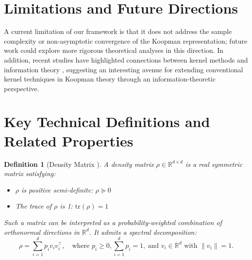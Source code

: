 \documentclass{article} %
\newtheorem{lemma}[theorem]{Lemma}
\newtheorem{definition}[theorem]{Definition}
\begin{document}
\section{Limitations and Future Directions} \label{append:limit_and_future}
A current limitation of our framework is that it does not address the sample complexity or non-asymptotic convergence of the Koopman representation; future work could explore more rigorous theoretical analyses in this direction. In addition, recent studies have highlighted connections between kernel methods \citep{ kostic2022learning, kostic2023sharp, kostic2024consistent} and information theory \citep{bach2022information}, suggesting an interesting avenue for extending conventional kernel techniques in Koopman theory through an information-theoretic perspective.



\clearpage
\section{Key Technical Definitions and Related Properties} \label{append:def_and_prop}

\begin{definition}[Density Matrix \citep{bach2022information}]
A \emph{density matrix} \( \rho \in \mathbb{R}^{d \times d} \) is a real symmetric matrix satisfying:
\begin{itemize}
    \item \( \rho \) is positive semi-definite: \( \rho \succeq 0 \)
    \item The trace of \( \rho \) is 1: \( \mathrm{tr}(\rho) = 1 \)
\end{itemize}
Such a matrix can be interpreted as a probability-weighted combination of orthonormal directions in \( \mathbb{R}^d \). It admits a spectral decomposition:
\[
\rho = \sum_{i=1}^d p_i v_i v_i^\top, \quad \text{where } p_i \geq 0, \sum_{i=1}^d p_i = 1,\ \text{and } v_i \in \mathbb{R}^d \text{ with } \|v_i\| = 1.
\]
\end{definition}
\end{document}
